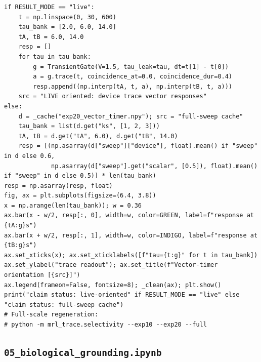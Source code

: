 \begin{lstlisting}[caption={04\_temporal\_selectivity.ipynb code cell 4},label={lst:mrl-nb-04-temporal-selectivity-4}]
if RESULT_MODE == "live":
    t = np.linspace(0, 30, 600)
    tau_bank = [2.0, 6.0, 14.0]
    tA, tB = 6.0, 14.0
    resp = []
    for tau in tau_bank:
        g = TransientGate(V=1.5, tau_leak=tau, dt=t[1] - t[0])
        a = g.trace(t, coincidence_at=0.0, coincidence_dur=0.4)
        resp.append((np.interp(tA, t, a), np.interp(tB, t, a)))
    src = "LIVE oriented: device trace vector responses"
else:
    d = _cache("exp20_vector_timer.npy"); src = "full-sweep cache"
    tau_bank = list(d.get("ks", [1, 2, 3]))
    tA, tB = d.get("tA", 6.0), d.get("tB", 14.0)
    resp = [(np.asarray(d["sweep"]["device"], float).mean() if "sweep" in d else 0.6,
             np.asarray(d["sweep"].get("scalar", [0.5]), float).mean() if "sweep" in d else 0.5)] * len(tau_bank)
resp = np.asarray(resp, float)
fig, ax = plt.subplots(figsize=(6.4, 3.8))
x = np.arange(len(tau_bank)); w = 0.36
ax.bar(x - w/2, resp[:, 0], width=w, color=GREEN, label=f"response at {tA:g}s")
ax.bar(x + w/2, resp[:, 1], width=w, color=INDIGO, label=f"response at {tB:g}s")
ax.set_xticks(x); ax.set_xticklabels([f"tau={t:g}" for t in tau_bank])
ax.set_ylabel("trace readout"); ax.set_title(f"Vector-timer orientation [{src}]")
ax.legend(frameon=False, fontsize=8); _clean(ax); plt.show()
print("claim status: live-oriented" if RESULT_MODE == "live" else "claim status: full-sweep cache")
# Full-scale regeneration:
# python -m mrl_trace.selectivity --exp10 --exp20 --full
\end{lstlisting}

\subsection{\texttt{05\_biological\_grounding.ipynb}}

